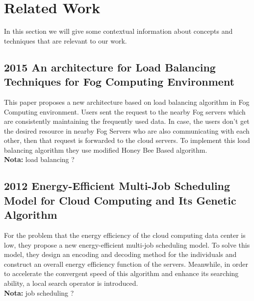 \vfill
\pagebreak
\section{Related Work}
\label{sec:RelatedWork}

In this section we will give some contextual information about concepts and techniques that are relevant to our work.

\subsection{2015 An architecture for Load Balancing Techniques for Fog Computing Environment}
This paper proposes a new architecture based on load balancing algorithm in Fog Computing environment. Users sent the request to the nearby Fog servers which are consistently maintaining the frequently used data. In case, the users don’t get the desired resource in nearby Fog Servers who are also communicating with each other, then that request is forwarded to the cloud servers. To implement this load balancing algorithm they use modified Honey Bee Based algorithm.\\
\textbf{Nota:} load balancing ?

\subsection{2012 Energy-Efficient Multi-Job Scheduling Model for Cloud Computing and Its Genetic Algorithm}
For the problem that the energy efficiency of the cloud computing data center is low, they propose a new energy-efficient multi-job scheduling model. To solve this model, they design an encoding and decoding method for the individuals and construct an overall energy efficiency function of the servers. Meanwhile, in order to accelerate the convergent speed of this algorithm and enhance its searching ability, a local search operator is introduced.\\
\textbf{Nota:} job scheduling ?

